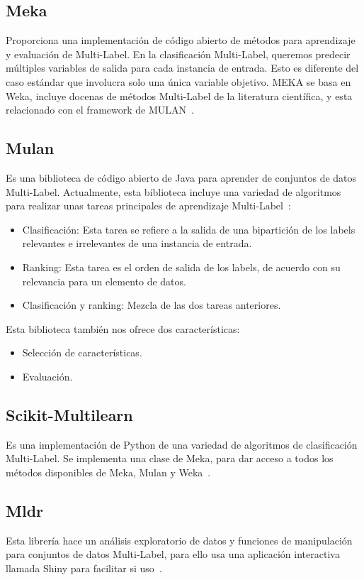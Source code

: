 \subsection{Meka}
Proporciona una implementación de código abierto de métodos para aprendizaje y evaluación de Multi-Label. En la clasificación Multi-Label, queremos predecir múltiples variables de salida para cada instancia de entrada. Esto es diferente del caso estándar que involucra solo una única variable objetivo. MEKA se basa en Weka, incluye docenas de métodos Multi-Label de la literatura científica, y esta relacionado con el framework de MULAN~\cite{meka}.

\subsection{Mulan}
Es una biblioteca de código abierto de Java para aprender de conjuntos de datos Multi-Label. Actualmente, esta biblioteca incluye una variedad de algoritmos para realizar unas tareas principales de aprendizaje Multi-Label~\cite{mulan}:
\begin{itemize}
	\item Clasificación: Esta tarea se refiere a la salida de una bipartición de los labels relevantes e irrelevantes de una instancia de entrada.
	\item Ranking: Esta tarea es el orden de salida de los labels, de acuerdo con su relevancia para un elemento de datos.
	\item Clasificación y ranking: Mezcla de las dos tareas anteriores.
\end{itemize}
Esta biblioteca también nos ofrece dos características:
\begin{itemize}
	\item Selección de características.
	\item Evaluación.
\end{itemize}

\subsection{Scikit-Multilearn}
Es una implementación de Python de una variedad de algoritmos de clasificación Multi-Label.
Se implementa una clase de Meka, para dar acceso a todos los métodos disponibles de Meka, Mulan y Weka~\cite{scikit-multilearn}.

\subsection{Mldr}
Esta librería hace un análisis exploratorio de datos y funciones de manipulación para conjuntos de datos Multi-Label, para ello usa una aplicación interactiva llamada Shiny para facilitar si uso~\cite{mldr}.

